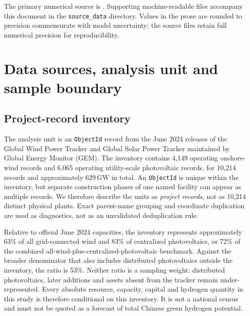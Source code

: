 \documentclass[pdflatex,sn-nature]{sn-jnl}
\begin{document}
The primary numerical source is . Supporting machine-readable files accompany this document in the \texttt{source\_data} directory. Values in the prose are rounded to precision commensurate with model uncertainty; the source files retain full numerical precision for reproducibility.

\begingroup
\footnotesize
\setlength{\parskip}{0pt}
\tableofcontents
\endgroup

\clearpage

\section{Data sources, analysis unit and sample boundary}\label{sec:data}

\subsection{Project-record inventory}

The analysis unit is an \texttt{ObjectId} record from the June 2024 releases of the Global Wind Power Tracker and Global Solar Power Tracker maintained by Global Energy Monitor (GEM)\cite{gem2024}. The inventory contains 4,149 operating onshore-wind records and 6,065 operating utility-scale photovoltaic records, for 10,214 records and approximately 629\,GW in total. An \texttt{ObjectId} is unique within the inventory, but separate construction phases of one named facility can appear as multiple records. We therefore describe the units as \emph{project records}, not as 10,214 distinct physical plants. Exact parent-name grouping and coordinate duplication are used as diagnostics, not as an unvalidated deduplication rule.

Relative to official June 2024 capacities, the inventory represents approximately 63\% of all grid-connected wind and 83\% of centralized photovoltaics, or 72\% of the combined all-wind-plus-centralized-photovoltaic benchmark\cite{nea2024capacity}. Against the broader denominator that also includes distributed photovoltaics outside the inventory, the ratio is 53\%. Neither ratio is a sampling weight: distributed photovoltaics, later additions and assets absent from the tracker remain under-represented. Every absolute resource, capacity, capital and hydrogen quantity in this study is therefore conditional on this inventory. It is not a national census and must not be quoted as a forecast of total Chinese green hydrogen potential.
\end{document}
